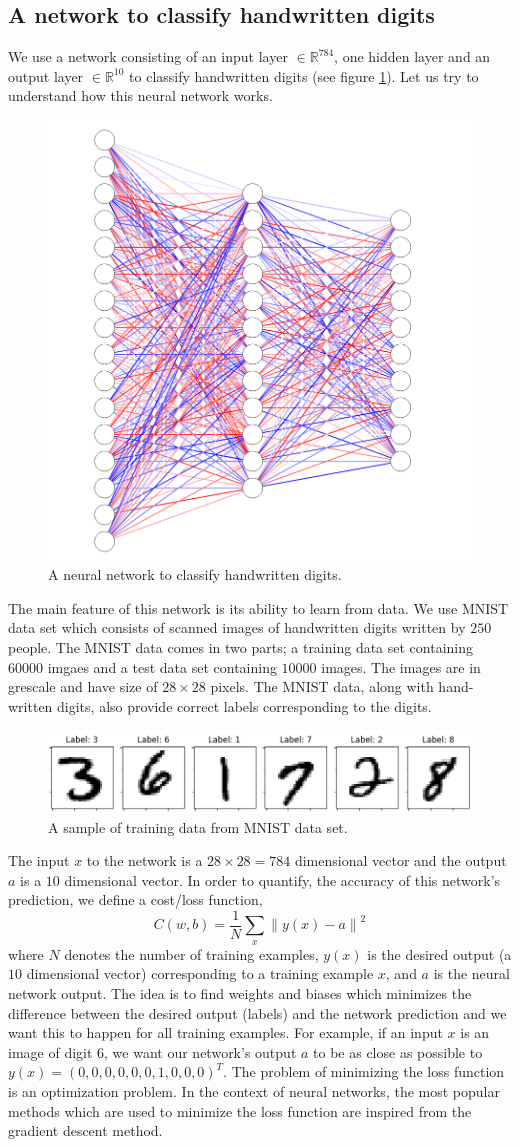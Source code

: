 \subsection{A network to classify handwritten digits}
We use a network consisting of an input layer $\in \mathbb{R}^{784}$, one hidden layer and an output layer $\in \mathbb{R}^{10}$ to classify handwritten
digits (see figure \ref{fig:NN_HD}). Let us try to understand how this neural network works. 
\begin{figure}[htbp]
    \centering
    \includegraphics[width=.4\textwidth]{Figures/NN_2.png}
    \caption{A neural network to classify handwritten digits.}
    \label{fig:NN_HD}
\end{figure} 
The main feature of this network is its ability to learn from data. We use MNIST data set which consists of scanned images of handwritten digits written by $250$ people. The MNIST data
comes in two parts; a training data set containing $60000$ imgaes and a test data set containing $10000$ images. The images are in grescale and have size of $28 \times 28$ pixels.
The MNIST data, along with hand-written digits, also provide correct labels corresponding to the digits. 
\begin{figure}[htbp]
    \centering
    \includegraphics[width=.4\textwidth]{Figures/mnist_data_sample.png}
    \caption{A sample of training data from MNIST data set.}
    \label{fig:mnist_data}
\end{figure} 
The input $x$ to the network is a $28 \times 28 = 784$ dimensional vector and the output $a$ is a $10$ dimensional vector. In order to quantify, the 
accuracy of this network's prediction, we define a cost/loss function,
$$C(w,b) = \frac{1}{N} \sum_x {\|y(x) - a\|}^2$$
where $N$ denotes the number of training examples, $y(x)$ is the desired output (a $10$ dimensional vector) corresponding to a training example $x$, and 
$a$ is the neural network output. The idea is to find weights and biases which minimizes the difference between the desired output (labels) and the network prediction and we want this to happen for all training examples. For example, 
if an input $x$ is an image of digit $6$, we want our network's output $a$ to be as close as possible to $y(x) = (0,0,0,0,0,0,1,0,0,0)^T$. The problem of 
minimizing the loss function is an optimization problem. In the context of neural networks, the most popular methods which are used to minimize the loss function are 
inspired from the gradient descent method. 

